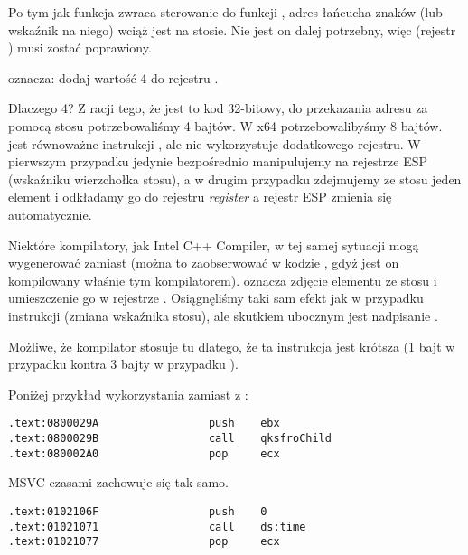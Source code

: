 Po tym jak funkcja \printf zwraca sterowanie do funkcji \main, adres łańcucha znaków (lub wskaźnik na niego) wciąż jest na stosie.
Nie jest on dalej potrzebny, więc  (rejestr \ESP) musi zostać poprawiony.

 oznacza: dodaj wartość 4 do rejestru \ESP.

Dlaczego 4? Z racji tego, że jest to kod 32-bitowy, do przekazania adresu za pomocą stosu potrzebowaliśmy 4 bajtów. W x64 potrzebowalibyśmy 8 bajtów.\\
 jest równoważne instrukcji , ale nie wykorzystuje dodatkowego rejestru. W pierwszym przypadku jedynie bezpośrednio manipulujemy na rejestrze ESP (wskaźniku wierzchołka stosu), a w drugim przypadku zdejmujemy ze stosu jeden element i odkładamy go do rejestru \emph{register} a rejestr ESP zmienia się automatycznie.

\myindex{\oracle}

Niektóre kompilatory, jak Intel C++ Compiler, w tej samej sytuacji mogą wygenerować  zamiast \ADD (można to zaobserwować w kodzie \oracle{}, gdyż jest on kompilowany właśnie tym kompilatorem).
 oznacza zdjęcie elementu ze stosu i umieszczenie go w rejestrze \ECX.
Osiągnęliśmy taki sam efekt jak w przypadku instrukcji \ADD (zmiana wskaźnika stosu), ale skutkiem ubocznym jest nadpisanie \ECX.

Możliwe, że kompilator stosuje tu  dlatego, że ta instrukcja jest krótsza (1 bajt w przypadku  kontra 3 bajty w przypadku ).

Poniżej przykład wykorzystania \POP zamiast \ADD z \oracle{}:

\begin{lstlisting}[caption=\oracle 10.2 Linux (plik app.o),style=customasmx86]
.text:0800029A                 push    ebx
.text:0800029B                 call    qksfroChild
.text:080002A0                 pop     ecx
\end{lstlisting}

MSVC czasami zachowuje się tak samo.

\begin{lstlisting}[caption=MineSweeper from Windows 7 32-bit]
.text:0102106F                 push    0
.text:01021071                 call    ds:time
.text:01021077                 pop     ecx
\end{lstlisting}

